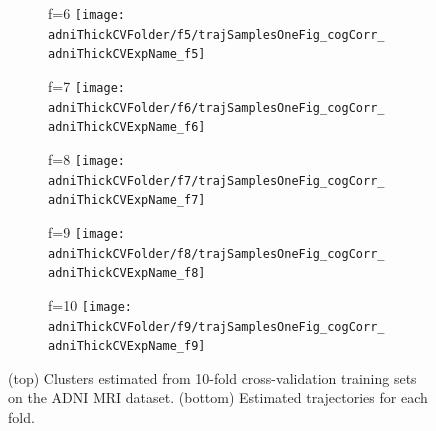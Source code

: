 \begin{figure}
\begin{subfigure}[b]{0.223\textwidth}
\centering
f=6
\texttt{[image: \\adniThickCVFolder/f5/trajSamplesOneFig\_cogCorr\_\\adniThickCVExpName\_f5]}
\end{subfigure}
\hfill
\begin{subfigure}[b]{0.185\textwidth}
\centering
f=7
\texttt{[image: \\adniThickCVFolder/f6/trajSamplesOneFig\_cogCorr\_\\adniThickCVExpName\_f6]}
\end{subfigure}
\hfill
\begin{subfigure}[b]{0.185\textwidth}
\centering
f=8
\texttt{[image: \\adniThickCVFolder/f7/trajSamplesOneFig\_cogCorr\_\\adniThickCVExpName\_f7]}
\end{subfigure}
\hfill
\begin{subfigure}[b]{0.185\textwidth}
\centering
f=9
\texttt{[image: \\adniThickCVFolder/f8/trajSamplesOneFig\_cogCorr\_\\adniThickCVExpName\_f8]}
\end{subfigure}
\hfill
\begin{subfigure}[b]{0.185\textwidth}
\centering
f=10
\texttt{[image: \\adniThickCVFolder/f9/trajSamplesOneFig\_cogCorr\_\\adniThickCVExpName\_f9]}
\end{subfigure}
\hfill

%     
%   
\caption[DIVE estimated clusters and trajectories over the 10 cross-validation folds]{(top) Clusters estimated from 10-fold cross-validation training sets on the ADNI MRI dataset. (bottom) Estimated trajectories for each fold. }
\label{fig:diveClustTrajCV}
\end{figure}

